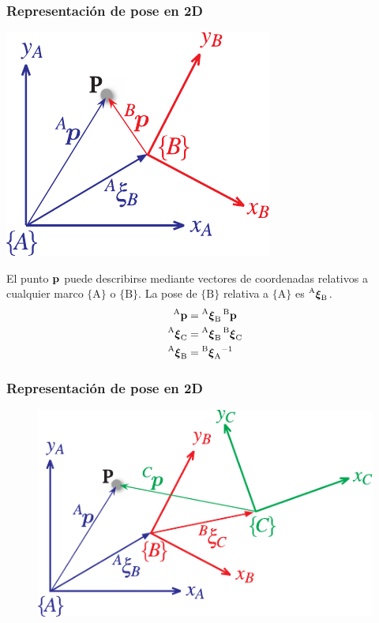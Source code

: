 \begin{frame}
    \frametitle{Representación de pose en 2D}
    \small
    \begin{center}
        \includegraphics[width=0.3\columnwidth]{./images/coordinate_frames.pdf}
    \end{center}


    El punto $\point$ puede describirse mediante vectores de coordenadas relativos a cualquier marco $\{\mathrm{A}\}$ o $\{\mathrm{B}\}$. La pose de $\{\mathrm{B}\}$ relativa a $\{\mathrm{A}\}$ es $\transform{A}{B}$.
    \begin{align*}
        \pointCoord{A} &= \transform{A}{B}\pointCoord{B}\\
        \transform{A}{C} &= \transform{A}{B}\transform{B}{C}\\
        \transform{A}{B} &= \transform{B}{A}^{-1}
    \end{align*}

\end{frame}


\begin{frame}
    \frametitle{Representación de pose en 2D}
    
    \begin{figure}[!h]
        \includegraphics[width=0.6\columnwidth]{./images/multiple_coordinate_frames_2d.pdf}
    \end{figure}

\end{frame}


